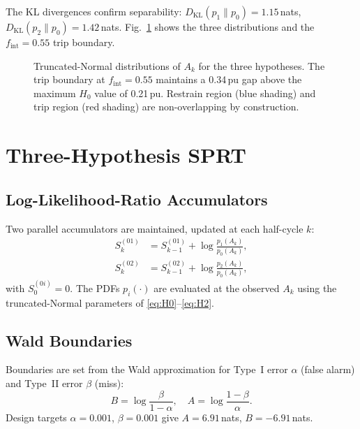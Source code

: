 \documentclass[journal,twoside,10pt]{IEEEtran}
\newcommand{\fint}{f_{\mathrm{int}}}
\newcommand{\Ak}{A_k}
\newcommand{\DKL}{D_{\mathrm{KL}}}
\begin{document}
The KL divergences confirm separability:
$\DKL(p_1 \| p_0) = 1.15\,$nats, $\DKL(p_2 \| p_0) = 1.42\,$nats.
Fig.~\ref{fig:distributions} shows the three distributions and the
$\fint = 0.55$ trip boundary.

\begin{figure}[!t]
  \centering
  
  \caption{Truncated-Normal distributions of $\Ak$ for the three
           hypotheses. The trip boundary at $\fint = 0.55$ maintains a
           0.34\,pu gap above the maximum $H_0$ value of 0.21\,pu.
           Restrain region (blue shading) and trip region (red shading)
           are non-overlapping by construction.}
  \label{fig:distributions}
\end{figure}

\section{Three-Hypothesis SPRT}
\label{sec:sprt}

\subsection{Log-Likelihood-Ratio Accumulators}

Two parallel accumulators are maintained, updated at each half-cycle $k$:
\begin{align}
  S^{(01)}_k &= S^{(01)}_{k-1} + \log\frac{p_1(\Ak)}{p_0(\Ak)},
  \label{eq:S01} \\
  S^{(02)}_k &= S^{(02)}_{k-1} + \log\frac{p_2(\Ak)}{p_0(\Ak)},
  \label{eq:S02}
\end{align}
with $S^{(0i)}_0 = 0$.
The PDFs $p_i(\cdot)$ are evaluated at the observed $\Ak$ using the
truncated-Normal parameters of \eqref{eq:H0}--\eqref{eq:H2}.

\subsection{Wald Boundaries}

Boundaries are set from the Wald approximation for Type~I error
$\alpha$ (false alarm) and Type~II error $\beta$ (miss):
\begin{equation}
  B = \log\frac{\beta}{1-\alpha}, \quad
  A = \log\frac{1-\beta}{\alpha}.
  \label{eq:wald}
\end{equation}
Design targets $\alpha = 0.001$, $\beta = 0.001$ give
$A = 6.91\,$nats, $B = -6.91\,$nats.
\end{document}
